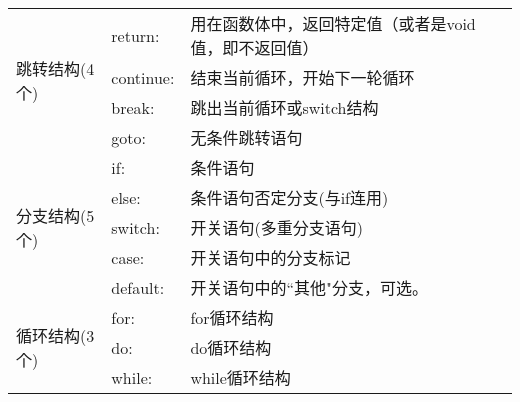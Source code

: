 \begin{table}[htbp]
\begin{center}
{\begin{tabular}{|l|l|l|}
\multirow{4}{*}{跳转结构(4个)}  & return: & 用在函数体中，返回特定值（或者是void值，即不返回值） \\
& continue: & 结束当前循环，开始下一轮循环 \\ 
& break: & 跳出当前循环或switch结构 \\
& goto: & 无条件跳转语句 \\ \hline

\multirow{5}{*}{分支结构(5个)}        & if: & 条件语句 \\
& else: & 条件语句否定分支(与if连用) \\ 
& switch: & 开关语句(多重分支语句) \\  
& case: & 开关语句中的分支标记 \\  
& default: & 开关语句中的``其他"分支，可选。 \\ \hline

\multirow{3}{*}{循环结构(3个)}      & for: & for循环结构 \\ 
& do: & do循环结构 \\ 
& while: & while循环结构  \\  \hline
\end{tabular} }
\end{center}
\end{table}



